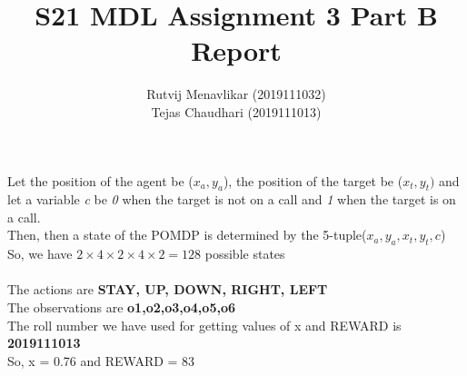 \documentclass[12pt]{report}
\title{S21 MDL Assignment 3 Part B Report}
\author{Rutvij Menavlikar (2019111032) \\ Tejas Chaudhari (2019111013)}
\theoremstyle{definition}
\theoremstyle{plain}
\begin{document}
\begin{titlepage} 
    \maketitle{}
\end{titlepage}
\begin{center}
\end{center}

Let the position of the agent be ($x_a,y_a$), the position of the target be ($x_t,y_t)$ and let a variable \emph{c} be \emph{0} when the target is not on a call and \emph{1} when the target is on a call. \\
Then, then a state of the POMDP is determined by the 5-tuple($x_a,y_a,x_t,y_t,c$) \\
So, we have $2\times 4 \times 2 \times 4 \times 2 = 128$ possible states \\ \\
The actions are \textbf{STAY, UP, DOWN, RIGHT, LEFT} \\
The observations are \textbf{o1,o2,o3,o4,o5,o6} \\
The roll number we have used for getting values of x and REWARD is \textbf{2019111013} \\
So, x = 0.76 and REWARD = 83
\vspace{0.2cm} \\ \hline
\end{document}
